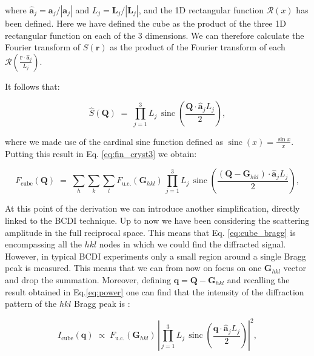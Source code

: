 where $\mathbf{\hat{a}}_j = \mathbf{a}_j/|\mathbf{a}_j|$ and $L_j = \mathbf{L}_j/|\mathbf{L}_j|$, and the 1D rectangular function
$ \mathcal R(x)$ has been defined. Here we have defined the cube as the product of the three 1D rectangular function on each 
of the 3 dimensions. We can therefore calculate the Fourier transform of $S(\mathbf{r})$ as the product of the Fourier 
transform of each $\mathcal{R}\left(\frac{\mathbf{r} \cdot \mathbf{\hat{a}}_j}{L_j}\right)$. 

It follows that: 

\begin{equation}
    \widehat S(\mathbf Q) \;=\; 
    \prod_{j=1}^{3} L_j \,\!\operatorname{sinc}\left(\frac{\mathbf{Q} \cdot \mathbf{\hat{a}}_j L_j}{2}\right),
\end{equation}

where we made use of the cardinal sine function defined as $\operatorname{sinc}(x) = \frac{\sin x}{x}$. 
Putting this result in Eq. \ref{eq:fin_cryst3} we obtain: 

\begin{equation}
    F_{\text{cube}}(\mathbf Q) \;=\; 
    \sum_{h} \sum_{k} \sum_{l} F_{\text{u.c.}}(\mathbf{G}_{hkl})\,
    \prod_{j=1}^{3} L_j \,\!\operatorname{sinc}\left(\frac{(\mathbf{Q}- \mathbf{G}_{hkl}) \cdot \mathbf{\hat{a}}_j L_j}{2}\right),
    \label{eq:cube_bragg}
\end{equation}

At this point of the derivation we can introduce another simplification, directly linked to the BCDI technique.
Up to now we have been considering the scattering amplitude in the full reciprocal space. This means that Eq. \ref{eq:cube_bragg}
is encompassing all the $hkl$ nodes in which we could find the diffracted signal. However, in typical BCDI experiments 
only a small region around a single Bragg peak is measured. This means that we can from now on focus on one $\mathbf{G}_{hkl}$ 
vector and drop the summation.  Moreover, defining $\mathbf q = \mathbf{Q}- \mathbf{G}_{hkl}$ and recalling the result obtained in Eq.\ref{eq:power} 
one can find that the intensity of the diffraction pattern of the $hkl$ Bragg peak is : 

\begin{equation}
    I_{\text{cube}}(\mathbf q) \;\propto\; 
    F_{\text{u.c.}}(\mathbf{G}_{hkl})\,
    \left | \prod_{j=1}^{3} L_j \,\!\operatorname{sinc}\left(\frac{\mathbf{q} \cdot \mathbf{\hat{a}}_j L_j}{2}\right)\right|^2,
    \label{eq:cube_bragg2}
\end{equation}



